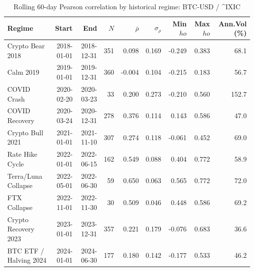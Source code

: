 \begin{table}[H]
\centering
\small
\caption{Rolling 60-day Pearson correlation by historical regime: BTC-USD / ^IXIC}
\label{tab:regime_corr_BTCUSDIXIC}
\begin{tabular}{lrrrrrrrr}
\toprule
Regime & Start & End & $N$ & $\bar{\rho}$ & $\sigma_\rho$ & Min $
ho$ & Max $
ho$ & Ann.Vol (\%) \\
\midrule
Crypto Bear 2018 & 2018-01-01 & 2018-12-31 & 351 & 0.098 & 0.169 & -0.249 & 0.383 & 68.1 \\
Calm 2019 & 2019-01-01 & 2019-12-31 & 360 & -0.004 & 0.104 & -0.215 & 0.183 & 56.7 \\
COVID Crash & 2020-02-20 & 2020-03-23 & 33 & 0.200 & 0.273 & -0.210 & 0.560 & 152.7 \\
COVID Recovery & 2020-03-24 & 2020-12-31 & 278 & 0.376 & 0.114 & 0.143 & 0.586 & 47.0 \\
Crypto Bull 2021 & 2021-01-01 & 2021-11-10 & 307 & 0.274 & 0.118 & -0.061 & 0.452 & 69.0 \\
Rate Hike Cycle & 2022-01-01 & 2022-06-15 & 162 & 0.549 & 0.088 & 0.404 & 0.772 & 58.9 \\
Terra/Luna Collapse & 2022-05-01 & 2022-06-30 & 59 & 0.650 & 0.063 & 0.565 & 0.772 & 72.0 \\
FTX Collapse & 2022-11-01 & 2022-11-30 & 30 & 0.509 & 0.046 & 0.448 & 0.586 & 69.2 \\
Crypto Recovery 2023 & 2023-01-01 & 2023-12-31 & 357 & 0.221 & 0.179 & -0.076 & 0.683 & 36.6 \\
BTC ETF / Halving 2024 & 2024-01-01 & 2024-06-30 & 177 & 0.180 & 0.142 & -0.177 & 0.533 & 46.2 \\
\bottomrule
\end{tabular}
\end{table}